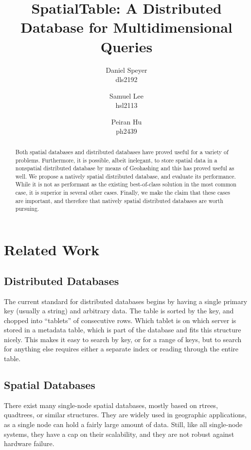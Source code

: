 \documentclass[11pt]{article}
\begin{document}
\author{Daniel Speyer\\dls2192 \and Samuel Lee\\hsl2113 \and Peiran Hu\\ph2439}
\title{SpatialTable: A Distributed Database for Multidimensional Queries}



\maketitle

\begin{abstract}
Both spatial databases and distributed databases have proved useful for a variety of problems.  Furthermore, it is possible, albeit inelegant, to store spatial data in a nonspatial distributed database by means of Geohashing and this has proved useful as well.  We propose a natively spatial distributed database, and evaluate its performance.  While it is not as performant as the existing best-of-class solution in the most common case, it is superior in several other cases.  Finally, we make the claim that these cases are important, and therefore that natively spatial distributed databases are worth pursuing.
\end{abstract}

\section{Related Work}

\subsection{Distributed Databases}

The current standard for distributed databases begins by having a single primary key (usually a string) and arbitrary data. The table is sorted by the key, and chopped into ``tablets'' of consecutive rows. Which tablet is on which server is stored in a metadata table, which is part of the database and fits this structure nicely. This makes it easy to search by key, or for a range of keys, but to search for anything else requires either a separate index or reading through the entire table.

\subsection{Spatial Databases}

There exist many single-node spatial databases, mostly based on rtrees\cite{rtrees}, quadtrees\cite{quadtrees}, or similar structures\cite{samet}. They are widely used in geographic applications, as a single node can hold a fairly large amount of data. Still, like all single-node systems, they have a cap on their scalability, and they are not robust against hardware failure.
\end{document}
